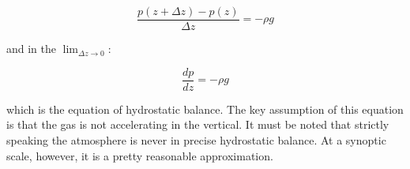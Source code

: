 \begin{equation}
    \frac{p(z + \Delta z) - p(z)}{\Delta z} = -\rho g
\end{equation}

and in the $\lim_{\Delta z \to 0}$:

\begin{equation}
    \frac{dp}{dz} = -\rho g
\end{equation}

which is the equation of hydrostatic balance. The key assumption of this equation is that the gas is not accelerating in the vertical. It must be noted that strictly speaking the atmosphere is never in precise hydrostatic balance\cite{iop}. At a synoptic scale, however, it is a pretty reasonable approximation. 


